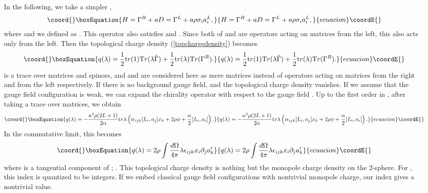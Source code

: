 \documentclass[a4paper,prl,showpacs,twocolumn]{revtex4}
\begin{document}
In the following, we take a simpler \coordHE{},
\begin{equation}\coord{}\boxEquation{
H=\Gamma^R + a D = \Gamma^L +a \rho \sigma_i a_i^L,
}{
H=\Gamma^R + a D = \Gamma^L +a \rho \sigma_i a_i^L,
}{ecuacion}\coordE{}\end{equation}
where \coordHE{} and we defined \coordHE{} 
as \coordHE{}.
This operator also satisfies \coordHE{} and 
\coordHE{}.
Since both of \coordHE{} and \coordHE{} are operators acting 
on matrices from the
left, this \coordHE{} also acts only from the left.
Then the topological charge density (\ref{topchargedensity})
becomes
\begin{equation}\coord{}\boxEquation{
q(\lambda)=\frac{1}{2}{\text tr}(1)
{\text Tr} (\lambda \hat{\Gamma})
+ \frac{1}{2}{\text tr}(\lambda) {\text Tr}(\Gamma^{R}).
}{
q(\lambda)=\frac{1}{2}{\text tr}(1)
{\text Tr} (\lambda \hat{\Gamma})
+ \frac{1}{2}{\text tr}(\lambda) {\text Tr}(\Gamma^{R}).
}{ecuacion}\coordE{}\end{equation}
\coordHE{} is a trace over matrices and spinors,
and \coordHE{} and \myHighlight{$\hat{\Gamma}$}\coordHE{}
are considered here as mere matrices instead of operators 
acting on matrices from the right and from the left respectively.
If there is no background gauge field, \coordHE{}
and the topological charge density vanishes.
If we assume that the gauge field configuration is weak, 
we can expand the chirality operator \myHighlight{$\hat{\Gamma}$}\coordHE{} 
with respect to the gauge field \coordHE{}.
Up to the first order in \coordHE{}, after taking a trace over \myHighlight{$\sigma$}\coordHE{} matrices,
we obtain
\begin{equation}\coord{}\boxEquation{
q(\lambda)=-\frac{a^3 \rho (2L+1)}{2\alpha}  {\text tr} \lambda \left( 
i \epsilon_{ijk}[L_i, a_j]x_k +2\rho\phi+\frac{\alpha}{2}[L_i,a_i]
\right).
}{
q(\lambda)=-\frac{a^3 \rho (2L+1)}{2\alpha}  {\text tr} \lambda \left( 
i \epsilon_{ijk}[L_i, a_j]x_k +2\rho\phi+\frac{\alpha}{2}[L_i,a_i]
\right).
}{ecuacion}\coordE{}\end{equation}
In the commutative limit, this becomes
\begin{equation}\coord{}\boxEquation{
q(\lambda) = 2\rho \int  \frac{d \Omega}{4 \pi} 
\lambda \epsilon_{ijk} x_i \partial_j a'_k
\label{chern}
}{
q(\lambda) = 2\rho \int  \frac{d \Omega}{4 \pi} 
\lambda \epsilon_{ijk} x_i \partial_j a'_k
}{ecuacion}\coordE{}\end{equation}
where \coordHE{} is a tangential component of \coordHE{};
\coordHE{}. 
This topological charge density is nothing but the monopole
charge density on the 2-sphere.
For \coordHE{}, this index is quantized to be integers.
If we embed classical gauge field configurations with
nontrivial monopole charge, our index gives a nontrivial value.
\end{document}
